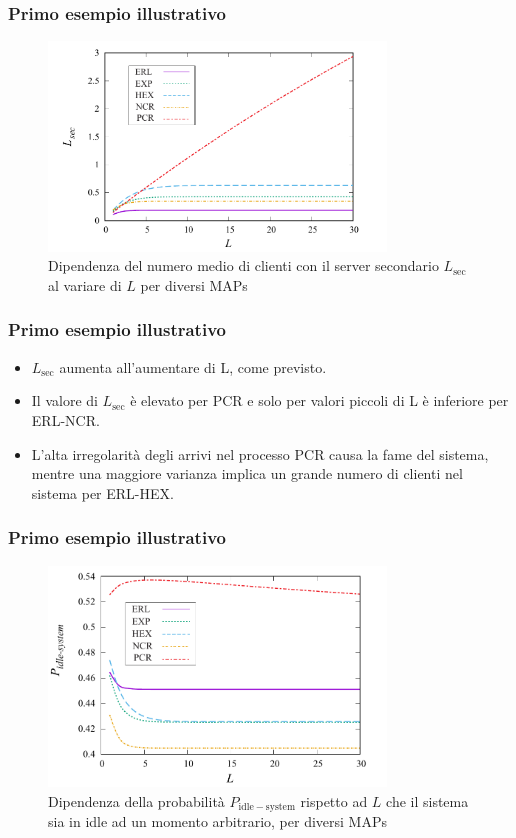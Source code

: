 \documentclass{beamer}
\begin{document}
\begin{frame}
    \frametitle{Primo esempio illustrativo}
    \begin{figure}[h]
        \centering
        \includegraphics[width=0.8\textwidth]{Tcjl81t.png}
        \caption{Dipendenza del numero medio di clienti con il server secondario $L_{\mathrm{sec}}$ al variare di $L$ per diversi MAPs}
        \label{fig:2}
    \end{figure}
\end{frame}


\begin{frame}
    \frametitle{Primo esempio illustrativo}
        \begin{itemize}
            \item $L_{\mathrm{sec}}$ aumenta all'aumentare di L, come previsto.
            \item Il valore di $L_{\mathrm{sec}}$ è elevato per PCR e solo per valori piccoli di L è inferiore per ERL-NCR.
            \item L'alta irregolarità degli arrivi nel processo PCR causa la fame del sistema, mentre una maggiore varianza implica un grande numero di clienti nel sistema per ERL-HEX.
        \end{itemize}
\end{frame}


\begin{frame}
    \frametitle{Primo esempio illustrativo}
    \begin{figure}[h]
        \centering
        \includegraphics[width=0.8\textwidth]{pSUZiNk.png}
        \caption{Dipendenza della probabilità $P_{\mathrm{idle-system}}$ rispetto ad $L$ che il sistema sia in idle ad un momento arbitrario, per diversi MAPs}
        \label{fig:3}
    \end{figure}
\end{frame}
\end{document}
